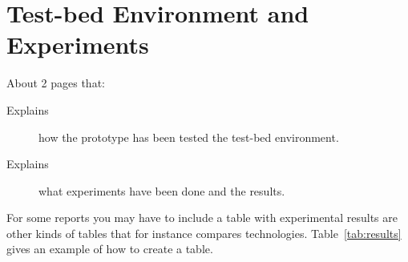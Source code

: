 \section{Test-bed Environment and Experiments}
\label{sec:evaluation}

About 2 pages that:

\begin{description}
\item[Explains] how the prototype has been tested the test-bed environment.

\item[Explains] what experiments have been done and the results.

\end{description}

For some reports you may have to include a table with experimental
results are other kinds of tables that for instance compares
technologies. Table~\ref{tab:results} gives an example of how to create a table.


